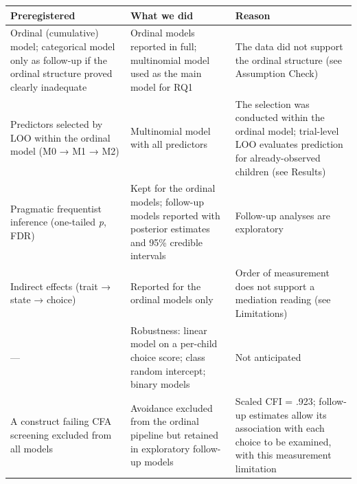 \documentclass[
  man,
  floatsintext,
  longtable,
  nolmodern,
  notxfonts,
  notimes,
  colorlinks=true,linkcolor=blue,citecolor=blue,urlcolor=blue]{apa7}
\makeatletter
\renewenvironment{longtable}[1][]%
    {\par\vspace{24pt}\noindent\begin{tabular}}%
    {\bottomrule\end{tabular}\par\vspace{24pt}}%
\let\endhead\apa@gobblefoot}
\makeatother
\begin{document}
\begin{table}
\begin{longtable}[]{@{}
  >{\raggedright\arraybackslash}p{}
  >{\raggedright\arraybackslash}p{}
  >{\raggedright\arraybackslash}p{}@{}}
\toprule\noalign{}
\begin{minipage}[b]{\linewidth}\raggedright
Preregistered
\end{minipage} & \begin{minipage}[b]{\linewidth}\raggedright
What we did
\end{minipage} & \begin{minipage}[b]{\linewidth}\raggedright
Reason
\end{minipage} \\
\midrule\noalign{}
\endhead
\bottomrule\noalign{}
\endlastfoot
Ordinal (cumulative) model; categorical model only as follow-up if the
ordinal structure proved clearly inadequate & Ordinal models reported in
full; multinomial model used as the main model for RQ1 & The data did
not support the ordinal structure (see Assumption Check) \\
Predictors selected by LOO within the ordinal model (M0 → M1 → M2) &
Multinomial model with all predictors & The selection was conducted
within the ordinal model; trial-level LOO evaluates prediction for
already-observed children (see Results) \\
Pragmatic frequentist inference (one-tailed \emph{p}, FDR) & Kept for
the ordinal models; follow-up models reported with posterior estimates
and 95\% credible intervals & Follow-up analyses are exploratory \\
Indirect effects (trait → state → choice) & Reported for the ordinal
models only & Order of measurement does not support a mediation reading
(see Limitations) \\
--- & Robustness: linear model on a per-child choice score; class random
intercept; binary models & Not anticipated \\
A construct failing CFA screening excluded from all models & Avoidance
excluded from the ordinal pipeline but retained in exploratory follow-up
models & Scaled CFI = .923; follow-up estimates allow its association
with each choice to be examined, with this measurement limitation \\
\end{longtable}

\end{table}
\end{document}
